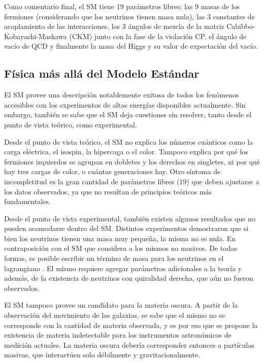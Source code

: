 Como comentario final, el SM tiene 19 parámetros libres: las 9 masas de los fermiones (considerando que los neutrinos tienen masa nula), las 3 constantes de acoplamiento de las interacciones, los 3 ángulos de mezcla de la matriz Cabibbo-Kobayashi-Maskawa (CKM) junto con la fase de la violación CP, el ángulo de vacío de QCD y finalmente la masa del Higgs y su valor de expectación del vacío.


\subsection{Física más allá del Modelo Estándar}

El SM provee una descripción notablemente exitosa de todos los fenómenos accesibles con los experimentos de altas energías disponibles actualmente. Sin embargo, también se sabe que el SM deja cuestiones sin resolver, tanto desde el punto de vista teórico, como experimental.

Desde el punto de vista teórico, el SM no explica los números cuánticos como la carga eléctrica, el isospin, la hipercaga o el color. Tampoco explica por qué los fermiones izquierdos se agrupan en dobletes y los derechos en singletes, ni por qué hay tres cargas de color, o cuántas generaciones hay. Otro síntoma de incompletitud es la gran cantidad de parámetros libres (19) que deben ajustarse a los datos observados, ya que no resultan de principios teóricos más fundamentales.

Desde el punto de vista experimental, también existen algunos resultados que no pueden acomodarse dentro del SM. Distintos experimentos demostraron que si bien los neutrinos tienen una masa muy pequeña, la misma no es nula. En contraposición con el SM que considera a los mismos no masivos. De todas formas, es posible escribir un término de masa para los neutrinos en el lagrangiano \cite{Drewes:2013gca}. El mismo requiere agregar parámetros adicionales a la teoría y además, de la existencia de neutrinos con quiralidad derecha, que aún no fueron observados.

El SM tampoco provee un candidato para la materia oscura. A partir de la observación del movimiento de las galaxias, se sabe que el mismo no se corresponde con la cantidad de materia observada, y es por eso que se propone la existencia de materia indetectable para los instrumentos astronómicos de medición actuales. La materia oscura debería corresponder entonces a partículas masivas, que interactúen solo débilmente y gravitacionalmente.

